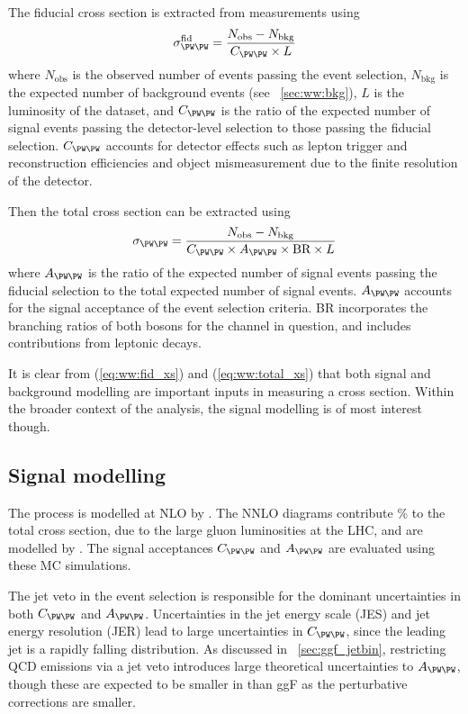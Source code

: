 The fiducial cross section is extracted from measurements using
\begin{equation}
	\sigma_{\WW}^{\text{fid}} = \frac{N_{\text{obs}} - N_{\text{bkg}}}{C_{\WW} \times L}
	\label{eq:ww:fid_xs}
\end{equation}
where $N_{\text{obs}}$ is the observed number of events passing the event selection, 
$N_{\text{bkg}}$ is the expected number of background events (see 
\Section~\ref{sec:ww:bkg}), $L$ is the luminosity of the dataset, and $C_{\WW}$ is the 
ratio of the expected number of signal events passing the detector-level selection to 
those passing the fiducial selection. $C_{\WW}$ accounts for detector effects such as 
lepton trigger and reconstruction efficiencies and object mismeasurement due to the 
finite resolution of the detector.

Then the total cross section can be extracted using
\begin{equation}
	\sigma_{\WW} = \frac{N_{\text{obs}} - N_{\text{bkg}}}{C_{\WW} \times A_{\WW} \times \text{BR} \times L}
	\label{eq:ww:total_xs}
\end{equation}
where $A_{\WW}$ is the ratio of the expected number of signal events passing the fiducial 
selection to the total expected number of signal events. $A_{\WW}$ accounts for the 
signal acceptance of the event selection criteria. BR incorporates the branching ratios 
of both \PW bosons for the channel in question, and includes contributions from leptonic 
\Ptau decays.

It is clear from (\ref{eq:ww:fid_xs}) and (\ref{eq:ww:total_xs}) that both signal and 
background modelling are important inputs in measuring a cross section. Within the 
broader context of the \HWW analysis, the signal modelling is of most interest though.



\subsection{Signal modelling}
\label{sec:ww:signal}

The \WW process is modelled at NLO by \meps{\mcatnlo}{\fherwig}. The NNLO \ggWW diagrams 
contribute \% to the total cross section, due to the large gluon luminosities at 
the LHC, and are modelled by \meps{\ggtoww}{\fherwig} \cite{gg2ww}. The signal 
acceptances $C_{\WW}$ and $A_{\WW}$ are evaluated using these MC simulations.

The jet veto in the event selection is responsible for the dominant uncertainties in both 
$C_{\WW}$ and $A_{\WW}$. Uncertainties in the jet energy scale (JES) and jet energy 
resolution (JER) lead to large uncertainties in $C_{\WW}$, since the leading jet \pt is a 
rapidly falling distribution. As discussed in \Section~\ref{sec:ggf_jetbin}, restricting 
QCD emissions via a jet veto introduces large theoretical uncertainties to $A_{\WW}$, 
though these are expected to be smaller in \WW than ggF as the perturbative corrections 
are smaller.

